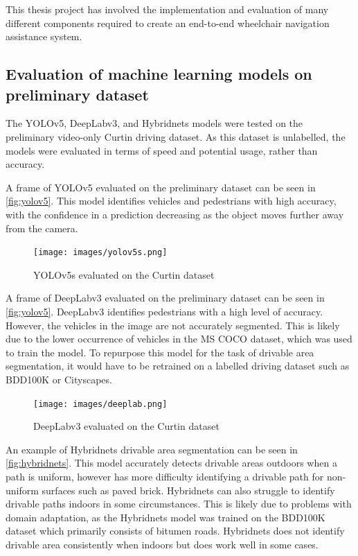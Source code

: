 This thesis project has involved the implementation and evaluation
of many different components required to create an end-to-end wheelchair
navigation assistance system.

\subsection{Evaluation of machine learning models on preliminary dataset}
The YOLOv5, DeepLabv3, and Hybridnets models were tested on the preliminary
video-only Curtin driving dataset. As this dataset is unlabelled, the
models were evaluated in terms of speed and potential usage, rather than accuracy.

A frame of YOLOv5 evaluated on the preliminary dataset can be seen in \cref{fig:yolov5}.
This model identifies vehicles and pedestrians with high accuracy, with the confidence in
a prediction decreasing as the object moves further away from the camera.

\begin{figure}[H]
    \centering
    \texttt{[image: images/yolov5s.png]}
    \caption{YOLOv5s evaluated on the Curtin dataset}
    \label{fig:yolov5s}
\end{figure}

A frame of DeepLabv3 evaluated on the preliminary dataset can be seen in \cref{fig:yolov5}.
DeepLabv3 identifies pedestrians with a high level of accuracy. However, the vehicles in the
image are not accurately segmented. This is likely due to the lower occurrence of vehicles
in the MS COCO dataset, which was used to train the model.
To repurpose this model for the task of drivable area segmentation,
it would have to be retrained on a labelled driving dataset such as BDD100K or Cityscapes.

\begin{figure}[H]
    \centering
    \texttt{[image: images/deeplab.png]}
    \caption{DeepLabv3 evaluated on the Curtin dataset}
    \label{fig:deeplab}
\end{figure}

An example of Hybridnets drivable area segmentation can be seen in \cref{fig:hybridnets}.
This model accurately detects drivable areas outdoors when a path is uniform, however
has more difficulty identifying a drivable path for non-uniform surfaces such as paved brick.
Hybridnets can also struggle to identify drivable paths indoors in some circumstances.
This is likely due to problems with domain adaptation, as the Hybridnets model was trained on the
BDD100K dataset which primarily consists of bitumen roads.
Hybridnets does not identify drivable area consistently when indoors
but does work well in some cases.

